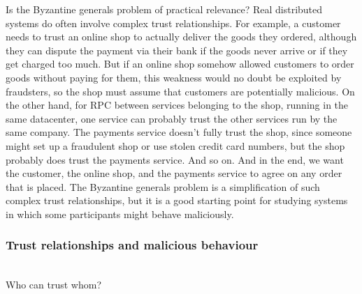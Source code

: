 Is the Byzantine generals problem of practical relevance?
Real distributed systems do often involve complex trust relationships.
For example, a customer needs to trust an online shop to actually deliver the goods they ordered, although they can dispute the payment via their bank if the goods never arrive or if they get charged too much.
But if an online shop somehow allowed customers to order goods without paying for them, this weakness would no doubt be exploited by fraudsters, so the shop must assume that customers are potentially malicious.
On the other hand, for RPC between services belonging to the shop, running in the same datacenter, one service can probably trust the other services run by the same company.
The payments service doesn't fully trust the shop, since someone might set up a fraudulent shop or use stolen credit card numbers, but the shop probably does trust the payments service.
And so on.
And in the end, we want the customer, the online shop, and the payments service to agree on any order that is placed.
The Byzantine generals problem is a simplification of such complex trust relationships, but it is a good starting point for studying systems in which some participants might behave maliciously.

\begin{frame}
    \label{s:byzantine-payment}
    \frametitle{Trust relationships and malicious behaviour}
    \begin{center}
        \\[1.5em]
        Who can trust whom?
    \end{center}
\end{frame}
\label{l:byzantine-payment}

